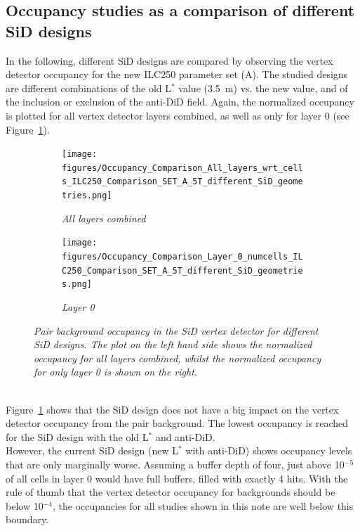 \subsection{Occupancy studies as a comparison of different SiD designs}
In the following, different SiD designs are compared by observing the vertex detector occupancy for the new ILC250 parameter set (A).
The studied designs are different combinations of the old L$^*$ value (\SI{3.5}{\meter}) vs. the new value, and of the inclusion or exclusion of the anti-DiD field.
Again, the normalized occupancy is plotted for all vertex detector layers combined, as well as only for layer 0 (see Figure~\ref{fig:SiD_comparison}).
\begin{figure}[!h]
\centering
\begin{subfigure}[t]{0.45\textwidth}
\centering
\texttt{[image: figures/Occupancy\_Comparison\_All\_layers\_wrt\_cells\_ILC250\_Comparison\_SET\_A\_5T\_different\_SiD\_geometries.png]}
\caption{\textit{All layers combined}}
\end{subfigure}
\hspace*{0.3cm}
\begin{subfigure}[t]{0.45\textwidth}
\centering
\texttt{[image: figures/Occupancy\_Comparison\_Layer\_0\_numcells\_ILC250\_Comparison\_SET\_A\_5T\_different\_SiD\_geometries.png]}
\caption{\textit{Layer 0}}
\end{subfigure}
\caption{\textit{Pair background occupancy in the SiD vertex detector for different SiD designs.
The plot on the left hand side shows the normalized occupancy for all layers combined, whilst the normalized occupancy for only layer 0 is shown on the right.}}
\label{fig:SiD_comparison}
\end{figure}
\\Figure~\ref{fig:SiD_comparison} shows that the SiD design does not have a big impact on the vertex detector occupancy from the pair background. 
The lowest occupancy is reached for the SiD design with the old L$^*$ and anti-DiD.\\
However, the current SiD design (new L$^*$ with anti-DiD) shows occupancy levels that are only marginally worse.
Assuming a buffer depth of four, just above 10$^{-5}$ of all cells in layer 0 would have full buffers, filled with exactly 4 hits.
With the rule of thumb that the vertex detector occupancy for backgrounds should be below 10$^{-4}$, the occupancies for all studies shown in this note are well below this boundary.